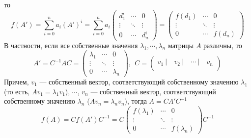 \documentclass[12pt]{article}
\begin{document}
	то \[f(A')=\sum\limits_{i=0}^n a_i(A')^i=\sum\limits_{i=0}^n a_i\begin{pmatrix}
	d_1^i & \cdots & 0\\
	\vdots & \ddots & \vdots\\
	0 & \cdots & d_n^i
	\end{pmatrix}=\begin{pmatrix}
	f(d_1) & \cdots & 0\\
	\vdots & \ddots & \vdots\\
	0 & \cdots & f(d_n)
	\end{pmatrix}\]
	В частности, если все собственные значения $\lambda_1,\cdots, \lambda_n$ матрицы $A$ различны, то 
	\[A'=C^{-1}AC=\begin{pmatrix}
	\lambda_1 & \cdots & 0\\
	\vdots & \ddots & \vdots\\
	0 & \cdots & \lambda_n
	\end{pmatrix},~~C= \begin{pmatrix}
	v_1~| & ~v_2~| & ~\cdots~| & ~v_n\\
	\end{pmatrix}\]
	Причем, $v_1$ --- собственный вектор, соответствующий собственному значению $\lambda_1$ (то есть, $Av_1=\lambda_1 v_1$), $\cdots$, $v_n$ --- собственный вектор, соответствующий собственному значению $\lambda_n$ ($Av_n=\lambda_n v_n$), тогда $A=CA'C^{-1}$
	\[f(A)=Cf(A')C^{-1}=C\begin{pmatrix}
	f(\lambda_1) & \cdots & 0\\
	\vdots & \ddots & \vdots\\
	0 & \cdots & f(\lambda_n)
	\end{pmatrix}C^{-1}\]
\end{document}
